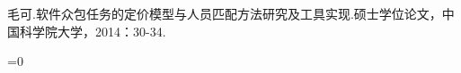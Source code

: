 \documentclass{article}
\begin{document}
\fi
\clearpage
{}
\begin{thebibliography}{}
	毛可.软件众包任务的定价模型与人员匹配方法研究及工具实现.硕士学位论文，中国科学院大学，2014：30-34.\par
\end{thebibliography}
\ifnum{}=0
	
\end{document}

